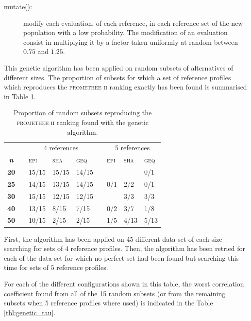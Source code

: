 \begin{description}
    \item[mutate(): ] modify each evaluation, of each reference, in each reference set of the new population with a low probability.
        The modification of an evaluation consist in multiplying it by a factor taken uniformly at random between $0.75$ and $1.25$.
\end{description}

This genetic algorithm has been applied on random subsets of alternatives of different sizes.
The proportion of subsets for which a set of reference profiles which reproduces the \textsc{promethee ii} ranking exactly has been found is summarised in Table \ref{tbl:genetic_results}.

\begin{table}[h]
    \centering
    \begin{tabular}{c l l l l l l l l}
        \toprule
        & & \multicolumn{3}{c}{4 references} &\phantom{abc} & \multicolumn{3}{c}{5 references} \\
        \cmidrule{3-5} \cmidrule{7-9}
        \bf \textit{n} & & \textsc{epi} &  \textsc{sha} & \textsc{geq}& &  \textsc{epi} &  \textsc{sha} & \textsc{geq}  \\
        \midrule
         \bf 20  & &  15/15 &  15/15 & 14/15 & &      &       & 0/1 \\
         \bf 25  & &  14/15 &  13/15 & 14/15 & &  0/1 &  2/2  & 0/1 \\
         \bf 30  & &  15/15 &  12/15 & 12/15 & &      &  3/3  & 3/3 \\
         \bf 40  & &  13/15 &   8/15 &  7/15 & &  0/2 &  3/7  & 1/8 \\
         \bf 50  & &  10/15 &   2/15 &  2/15 & &  1/5 &  4/13 & 5/13 \\
        \bottomrule
    \end{tabular}
    \caption{Proportion of random subsets reproducing the \textsc{promethee ii} ranking found with the genetic algorithm.}
    \label{tbl:genetic_results}
\end{table}

First, the algorithm has been applied on 45 different data set of each size searching for sets of 4 reference profiles. 
Then, the algorithm has been retried for each of the data set for which no perfect set had been found but searching this time for sets of $5$ reference profiles.

For each of the different configurations shown in this table, the worst correlation coefficient found from all of the 15 random subsets (or from the remaining subsets when 5 reference profiles where used) is indicated in the Table \ref{tbl:genetic_tau}.

